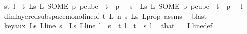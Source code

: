 \begin{isabellebody}
\ {\isachardoublequoteopen}{\isasymforall}s{\isacharless}{\kern0pt}t{\isachardot}{\kern0pt}\ {\isasymforall}l\ {\isacharless}{\kern0pt}\ t{\isachardot}{\kern0pt}\ {\isasymchi}L{\isacharunderscore}{\kern0pt}s\ {\isacharparenleft}{\kern0pt}L\ {\isacharparenleft}{\kern0pt}SOME\ p{\isachardot}{\kern0pt}\ p{\isasymin}cube\ {}\ {\isacharparenleft}{\kern0pt}t{\isacharplus}{\kern0pt}{}{\isacharparenright}{\kern0pt}\ {\isasymand}\ p\ {}\ {\isacharequal}{\kern0pt}\ s{\isacharparenright}{\kern0pt}{\isacharparenright}{\kern0pt}\ {\isacharequal}{\kern0pt}\ {\isasymchi}L{\isacharunderscore}{\kern0pt}s\ {\isacharparenleft}{\kern0pt}L\ {\isacharparenleft}{\kern0pt}SOME\ p{\isachardot}{\kern0pt}\ p{\isasymin}cube\ {}\ {\isacharparenleft}{\kern0pt}t{\isacharplus}{\kern0pt}{}{\isacharparenright}{\kern0pt}\ {\isasymand}\ p\ {}\ {\isacharequal}{\kern0pt}\ l{\isacharparenright}{\kern0pt}{\isacharparenright}{\kern0pt}{\isachardoublequoteclose}\ \isamarkupfalse%
\ dim{}{\isacharunderscore}{\kern0pt}layered{\isacharunderscore}{\kern0pt}subspace{\isacharunderscore}{\kern0pt}mono{\isacharunderscore}{\kern0pt}line{\isacharbrackleft}{\kern0pt}of\ t\ L\ n\ s\ {\isasymchi}L{\isacharunderscore}{\kern0pt}s{\isacharbrackright}{\kern0pt}\ L{\isacharunderscore}{\kern0pt}prop\ assms{\isacharparenleft}{\kern0pt}{}{\isacharparenright}{\kern0pt}\ \isamarkupfalse%
\ blast\isanewline
\ \ \ \ \ \ \isamarkupfalse%
\ \isamarkupfalse%
\ key{\isacharunderscore}{\kern0pt}aux{\isacharcolon}{\kern0pt}\ {\isachardoublequoteopen}{\isasymchi}L{\isacharunderscore}{\kern0pt}s\ {\isacharparenleft}{\kern0pt}L{\isacharunderscore}{\kern0pt}line\ s{\isacharparenright}{\kern0pt}\ {\isacharequal}{\kern0pt}\ {\isasymchi}L{\isacharunderscore}{\kern0pt}s\ {\isacharparenleft}{\kern0pt}L{\isacharunderscore}{\kern0pt}line\ l{\isacharparenright}{\kern0pt}{\isachardoublequoteclose}\ \ {\isachardoublequoteopen}s\ {\isasymin}\ {\isacharbraceleft}{\kern0pt}{\isachardot}{\kern0pt}{\isachardot}{\kern0pt}{\isacharless}{\kern0pt}t{\isacharbraceright}{\kern0pt}{\isachardoublequoteclose}\ {\isachardoublequoteopen}l\ {\isasymin}\ {\isacharbraceleft}{\kern0pt}{\isachardot}{\kern0pt}{\isachardot}{\kern0pt}{\isacharless}{\kern0pt}t{\isacharbraceright}{\kern0pt}{\isachardoublequoteclose}\ \ s\ l\ \isamarkupfalse%
\ that\ \ \isamarkupfalse%
\ L{\isacharunderscore}{\kern0pt}line{\isacharunderscore}{\kern0pt}def\ \isanewline

\end{isabellebody}
